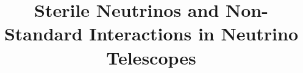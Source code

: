
\renewcommand{\familydefault}{\rmdefault}

\title{Sterile Neutrinos and Non-Standard Interactions in Neutrino Telescopes}



\cleardoublepage














